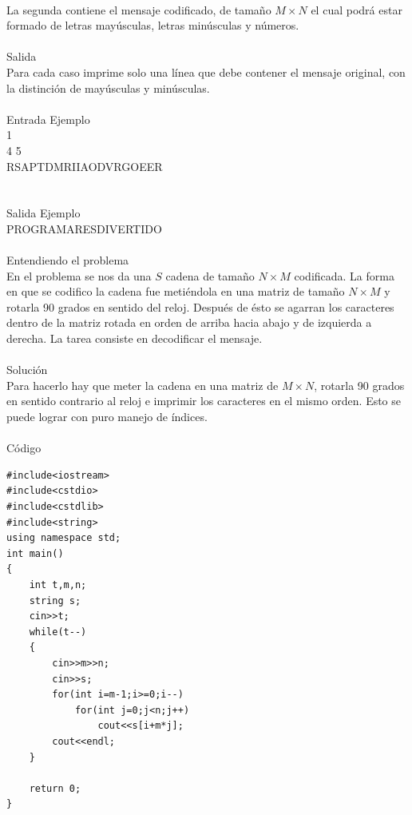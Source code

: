 \documentclass[12pt]{article}
\begin{document}
\\La segunda contiene el mensaje codificado, de tamaño $M × N$ el cual podrá estar formado de letras mayúsculas, letras minúsculas y números.
\\
\\
\textrm{\large Salida}
\\
Para cada caso imprime solo una línea que debe contener el mensaje original, con la distinción de mayúsculas y minúsculas.
\\
\\
\textrm{\large Entrada Ejemplo}
\\
1\\
4 5\\
RSAPTDMRIIAODVRGOEER\\
\\
\\
\textrm{\large Salida Ejemplo}
\\
PROGRAMARESDIVERTIDO\\
\\
\textrm{\large Entendiendo el problema}\\
En el problema se nos da una $S$ cadena de tamaño $N\times M$ codificada. La forma en que se codifico la cadena fue metiéndola en una matriz de tamaño $N \times M$ y rotarla 90 grados en sentido del reloj. Después de ésto se agarran los caracteres dentro de la matriz rotada en orden de arriba hacia abajo y de izquierda a derecha. La tarea consiste en decodificar el mensaje.\\
\\
\textrm{\large Solución}\\
 Para hacerlo hay que meter la cadena en una matriz de $M \times N$, rotarla 90 grados en sentido contrario al reloj e imprimir los caracteres en el mismo orden. Esto se puede lograr con puro manejo de índices.\\
\\
\textrm{\large Código}\\

\begin{verbatim}
#include<iostream>
#include<cstdio>
#include<cstdlib>
#include<string>
using namespace std;
int main()
{
    int t,m,n;
    string s;
    cin>>t;
    while(t--)
    {
        cin>>m>>n;
        cin>>s;
        for(int i=m-1;i>=0;i--)
            for(int j=0;j<n;j++)
                cout<<s[i+m*j];
        cout<<endl;
    }
 
    return 0;
}
\end{verbatim}
\newpage
\end{document}
